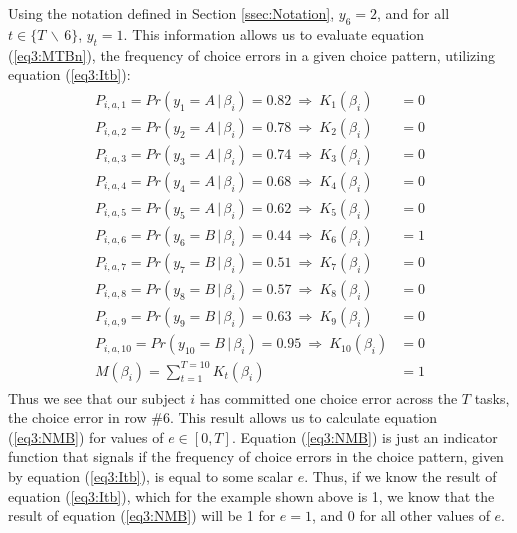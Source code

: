 \documentclass[../main.tex]{subfiles}
\begin{document}
Using the notation defined in Section \ref{ssec:Notation}, $y_6 = 2$, and for all $t \in \lbrace T \,\backslash\, 6 \rbrace$, $y_t = 1$.
This information allows us to evaluate equation (\ref{eq3:MTBn}), the frequency of choice errors in a given choice pattern, utilizing equation (\ref{eq3:Itb}):
\begin{align}
	\label{eq3:example_MTBn}
	\begin{split}
		P_{i,a,1}  = Pr(y_1 = A    \,|\, \beta_i) = 0.82 ~ \Rightarrow ~ K_{1}(\beta_i)  &= 0 \\
		P_{i,a,2}  = Pr(y_2 = A    \,|\, \beta_i) = 0.78 ~ \Rightarrow ~ K_{2}(\beta_i)  &= 0 \\
		P_{i,a,3}  = Pr(y_3 = A    \,|\, \beta_i) = 0.74 ~ \Rightarrow ~ K_{3}(\beta_i)  &= 0 \\
		P_{i,a,4}  = Pr(y_4 = A    \,|\, \beta_i) = 0.68 ~ \Rightarrow ~ K_{4}(\beta_i)  &= 0 \\
		P_{i,a,5}  = Pr(y_5 = A    \,|\, \beta_i) = 0.62 ~ \Rightarrow ~ K_{5}(\beta_i)  &= 0 \\
		P_{i,a,6}  = Pr(y_6 = B    \,|\, \beta_i) = 0.44 ~ \Rightarrow ~ K_{6}(\beta_i)  &= 1 \\
		P_{i,a,7}  = Pr(y_7 = B    \,|\, \beta_i) = 0.51 ~ \Rightarrow ~ K_{7}(\beta_i)  &= 0 \\
		P_{i,a,8}  = Pr(y_8 = B    \,|\, \beta_i) = 0.57 ~ \Rightarrow ~ K_{8}(\beta_i)  &= 0 \\
		P_{i,a,9}  = Pr(y_9 = B    \,|\, \beta_i) = 0.63 ~ \Rightarrow ~ K_{9}(\beta_i)  &= 0 \\
		P_{i,a,10} = Pr(y_{10} = B \,|\, \beta_i) = 0.95 ~ \Rightarrow ~ K_{10}(\beta_i) &= 0 \\
		                                M(\beta_i) = \sum_{t = 1}^{T = 10}{K_t(\beta_i)} &= 1
	\end{split}
\end{align}
\noindent Thus we see that our subject $i$ has committed one choice error across the $T$ tasks, the choice error in row \#6.
This result allows us to calculate equation (\ref{eq3:NMB}) for values of $e \in [ 0, T ]$.
Equation (\ref{eq3:NMB}) is just an indicator function that signals if the frequency of choice errors in the choice pattern, given by equation (\ref{eq3:Itb}), is equal to some scalar $e$.
Thus, if we know the result of equation (\ref{eq3:Itb}), which for the example shown above is 1, we know that the result of equation (\ref{eq3:NMB}) will be 1 for $e = 1$, and 0 for all other values of $e$.
\end{document}
